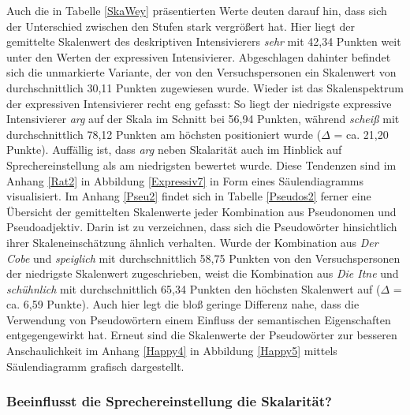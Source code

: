 Auch die in Tabelle \ref{SkaWey} präsentierten Werte deuten darauf hin, dass sich der Unterschied zwischen den Stufen stark vergrößert hat. Hier liegt der gemittelte Skalenwert des deskriptiven Intensivierers \textit{sehr} mit 42,34 Punkten weit unter den Werten der expressiven Intensivierer. Abgeschlagen dahinter befindet sich die unmarkierte Variante, der von den Versuchspersonen ein Skalenwert von durchschnittlich 30,11 Punkten zugewiesen wurde. Wieder ist das Skalenspektrum der expressiven Intensivierer recht eng gefasst: So liegt der niedrigste expressive Intensivierer \textit{arg} auf der Skala im Schnitt bei 56,94 Punkten, während \textit{scheiß} mit durchschnittlich 78,12 Punkten am höchsten positioniert wurde {($\Delta$ = ca. 21,20 Punkte)}. Auffällig ist, dass \textit{arg} neben Skalarität auch im Hinblick auf Sprechereinstellung als am niedrigsten bewertet wurde. Diese Tendenzen sind im Anhang \ref{Rat2} in Abbildung \ref{Expressiv7} in Form eines Säulendiagramms visualisiert. Im Anhang \ref{Pseu2} findet sich in {Tabelle \ref{Pseudos2}} ferner eine Übersicht der gemittelten Skalenwerte jeder Kombination aus Pseudonomen und Pseudoadjektiv. Darin ist zu verzeichnen, dass sich die Pseudowörter hinsichtlich ihrer Skaleneinschätzung ähnlich verhalten. Wurde der Kombination aus \textit{Der Cobe} und \textit{speiglich} mit durchschnittlich 58,75 Punkten von den Versuchspersonen der niedrigste Skalenwert zugeschrieben, weist die Kombination aus \textit{Die Itne} und \textit{schühnlich} mit durchschnittlich 65,34 Punkten den höchsten Skalenwert auf ({$\Delta$ = ca. 6,59 Punkte}). Auch hier legt die bloß geringe Differenz nahe, dass die Verwendung von Pseudowörtern einem Einfluss der semantischen Eigenschaften entgegengewirkt hat. Erneut sind die Skalenwerte der Pseudowörter zur besseren Anschaulichkeit im Anhang \ref{Happy4} in Abbildung \ref{Happy5} mittels Säulendiagramm {grafisch dargestellt}.





\subsubsection[Einfluss von Sprechereinstellung auf Skalarität]{Beeinflusst die Sprechereinstellung die Skalarität?}


